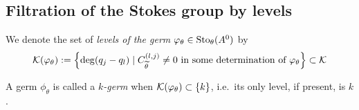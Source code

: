 \subsection{Filtration of the Stokes group by levels}
\begin{comment}
  See
  \cite{Loday1994}
  and
  \cite[362ff]{Martinet1991}
\end{comment}
We denote the set of \emph{levels of the germ}
$\varphi_{\theta}\in\operatorname{Sto}_\theta(A^0)$ by
\[
  \mathcal{K}(\varphi_\theta):= \left\{\deg(q_j-q_l)\mid C_{\widetilde\theta}^{(l,j)}\neq0
    \text{ in some determination of }\varphi_\theta\right\} \subset \mathcal{K}
\]
\begin{defn}
  A germ $\phi_\theta$ is called a \emph{$k$-germ} when
  $\mathcal{K}(\varphi_{\theta})\subset\{k\}$, i.e.\ its only level, if present, is $k$.
\end{defn}


